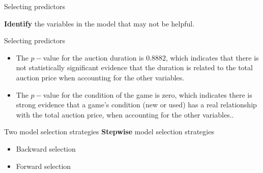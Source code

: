 \documentclass[12pt,a4paper]{beamer}
\begin{document}
	\begin{frame}{Selecting predictors}
		
			\begin{table}[ht]
			\end{table}
			\textbf{Identify}  the variables in the model that may not be helpful.
		\end{frame}
		\begin{frame}{Selecting predictors}
			\begin{itemize}
				\item The $p-$value for the auction duration is $0.8882$, which indicates that there is not statistically significant evidence that the duration is related to the total auction price when accounting for the other variables.
				\item The $p-$value for the  condition of the game is zero, which indicates there is strong evidence that a game's condition (new or used) has a real relationship with the total auction price, when accounting for the other variables..
			\end{itemize}
		\end{frame}
		\begin{frame}{Two model selection strategies}
			\textbf{Stepwise} model selection strategies
			\begin{itemize}
				\item Backward selection
				\item Forward selection
			\end{itemize}
		\end{frame}
\end{document}
